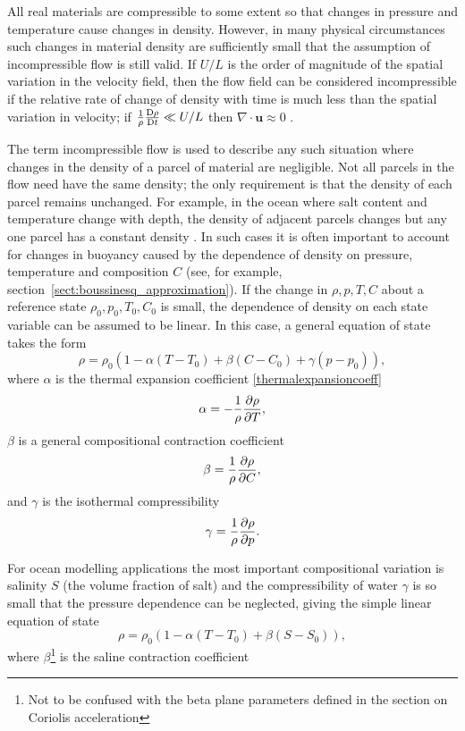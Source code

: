 All real materials are compressible to some extent so that changes in
pressure and temperature cause changes in density.  However, in many
physical circumstances such changes in material density are sufficiently
small that the assumption of incompressible flow is still valid. If $U/L$ is
the order of magnitude of the spatial variation in the velocity field, then
the flow field can be considered incompressible if the relative rate of
change of density with time is much less than the spatial variation in
velocity; \ie if $\frac{1}{\rho}\frac{\mathrm{D}\rho}{\mathrm{D} t}\ll U/L$ then
$\nabla\cdot\mathbf{u}\approx 0$ \cite[][p.167]{batchelor1967}.

The term incompressible flow is used to describe any such situation where
changes in the density of a parcel of material are negligible.  Not all
parcels in the flow need have the same density; the only requirement is that
the density of each parcel remains unchanged.  For example, in the ocean
where salt content and temperature change with depth, the density of
adjacent parcels changes but any one parcel has a constant density
\cite{panton2006}.  In such cases it is often important to account for
changes in buoyancy caused by the dependence of density on pressure,
temperature and composition $C$ (see, for example,
section~\ref{sect:boussinesq_approximation}).  If the change in $\rho,p,T,C$
about a reference state $\rho_0,p_0,T_0,C_0$ is small, the dependence of
density on each state variable can be assumed to be linear.  In this case, a
general equation of state takes the form
\begin{equation}
\rho = \rho_0(1 - \alpha(T-T_0) + \beta(C-C_0) + \gamma(p-p_0)),
\end{equation}
where $\alpha$ is the thermal expansion coefficient \eqref{thermalexpansioncoeff}
\begin{equation*}
\alpha = -\frac{1}{\rho}\frac{\partial\rho}{\partial T},
\end{equation*}
$\beta$ is a general compositional contraction coefficient
\begin{equation}
\beta = \frac{1}{\rho}\frac{\partial\rho}{\partial C},
\end{equation}
and $\gamma$ is the isothermal compressibility
\begin{equation}
\gamma = \frac{1}{\rho}\frac{\partial\rho}{\partial p}.
\end{equation}

For ocean modelling applications the most important compositional variation is salinity $S$ (the volume fraction of salt) and the compressibility of water $\gamma$ is so small that the pressure dependence can be neglected, giving the simple linear equation of state
\begin{equation}
\rho = \rho_0(1 - \alpha(T-T_0) + \beta(S-S_0)),
\end{equation}
where $\beta$\footnote{Not to be confused with the beta plane parameters defined in the section on Coriolis acceleration} is the saline contraction coefficient

